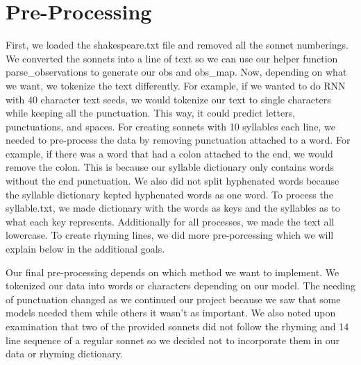 \section{Pre-Processing}
\medskip
First, we loaded the shakespeare.txt file and removed all the sonnet numberings. We converted the sonnets into a line of text so we can use our helper function parse_observations to generate our obs and obs_map. Now, depending on what we want, we tokenize the text differently. For example, if we wanted to do RNN with 40 character text seeds, we would tokenize our text to single characters while keeping all the punctuation. This way, it could predict letters, punctuations, and spaces. For creating sonnets with 10 syllables each line, we needed to pre-process the data by removing punctuation attached to a word. For example, if there was a word that had a colon attached to the end, we would remove the colon. This is because our syllable dictionary only contains words without the end punctuation. We also did not split hyphenated words because the syllable dictionary kepted hyphenated words as one word. To process the syllable.txt, we made dictionary with the words as keys and the syllables as to what each key represents. Additionally for all processes, we made the text all lowercase. To create rhyming lines, we did more pre-porcessing which we will explain below in the additional goals. 

Our final pre-processing depends on which method we want to implement. We tokenized our data into words or characters depending on our model. The needing of punctuation changed as we continued our project because we saw that some models needed them while others it wasn't as important. We also noted upon examination that two of the provided sonnets did not follow  the rhyming and 14 line sequence of a regular sonnet so we decided not to incorporate them in our data or rhyming dictionary. 
\newpage

